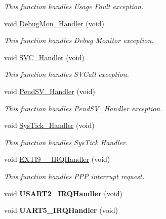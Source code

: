 \begin{DoxyCompactItemize}
\begin{DoxyCompactList}\small\item\em This function handles Usage Fault exception. \end{DoxyCompactList}\item 
void \hyperlink{group___t_i_m___p_w_m___output_gadbdfb05858cc36fc520974df37ec3cb0}{Debug\+Mon\+\_\+\+Handler} (void)
\begin{DoxyCompactList}\small\item\em This function handles Debug Monitor exception. \end{DoxyCompactList}\item 
void \hyperlink{group___t_i_m___p_w_m___output_ga3e5ddb3df0d62f2dc357e64a3f04a6ce}{S\+V\+C\+\_\+\+Handler} (void)
\begin{DoxyCompactList}\small\item\em This function handles S\+V\+Call exception. \end{DoxyCompactList}\item 
void \hyperlink{group___t_i_m___p_w_m___output_ga6303e1f258cbdc1f970ce579cc015623}{Pend\+S\+V\+\_\+\+Handler} (void)
\begin{DoxyCompactList}\small\item\em This function handles Pend\+S\+V\+\_\+\+Handler exception. \end{DoxyCompactList}\item 
void \hyperlink{group___t_i_m___p_w_m___output_gab5e09814056d617c521549e542639b7e}{Sys\+Tick\+\_\+\+Handler} (void)
\begin{DoxyCompactList}\small\item\em This function handles Sys\+Tick Handler. \end{DoxyCompactList}\item 
void \hyperlink{group___t_i_m___p_w_m___output_ga7b2096b8b2643286dc3a7e5110e5ae85}{E\+X\+T\+I9\+\_\+\_\+\+I\+R\+Q\+Handler} (void)
\begin{DoxyCompactList}\small\item\em This function handles P\+P\+P interrupt request. \end{DoxyCompactList}\item 
\hypertarget{group___t_i_m___p_w_m___output_ga0ca6fd0e6f77921dd1123539857ba0a8}{}void {\bfseries U\+S\+A\+R\+T2\+\_\+\+I\+R\+Q\+Handler} (void)\label{group___t_i_m___p_w_m___output_ga0ca6fd0e6f77921dd1123539857ba0a8}

\item 
\hypertarget{group___t_i_m___p_w_m___output_gaa1c474cac5abda23ebbe8a9e8f4d7551}{}void {\bfseries U\+A\+R\+T5\+\_\+\+I\+R\+Q\+Handler} (void)\label{group___t_i_m___p_w_m___output_gaa1c474cac5abda23ebbe8a9e8f4d7551}


\end{DoxyCompactItemize}
